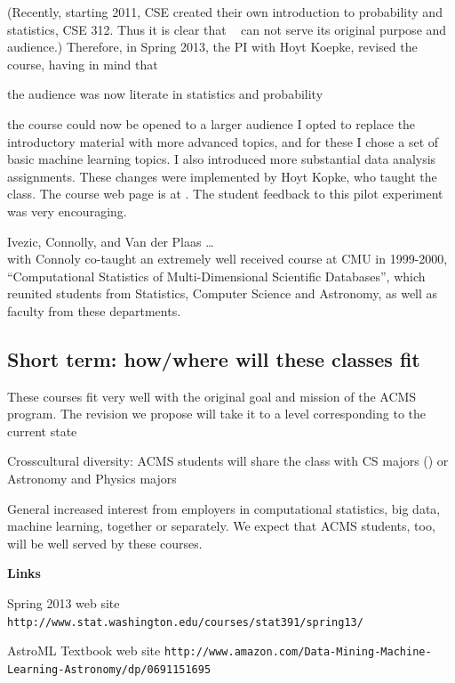 (Recently, starting 2011, CSE created their own introduction to
probability and statistics, {\sc CSE 312}. Thus it is clear that
\statcl~ can not serve its original purpose and audience.)
Therefore, in Spring 2013, the PI \meila with Hoyt Koepke, revised the
course, having in mind that \bit
\item the audience was now literate in statistics and probability
\item the course could now be opened to a larger audience 
\eit
I opted to replace the introductory material with more advanced topics, and for these I chose a set of basic machine learning topics. I also introduced more substantial data analysis assignments. These changes were implemented by Hoyt Kopke, who taught the class. The course web page is at {\tt }. The student feedback to this pilot experiment was very encouraging. 

Ivezic, Connolly, and Van der Plaas \ldots \\
\meila with Connoly co-taught an extremely well received course at CMU
in 1999-2000, ``Computational Statistics of Multi-Dimensional
Scientific Databases'', which reunited students from Statistics,
Computer Science and Astronomy, as well as faculty from these
departments.



\subsection{Short term: how/where will these classes fit}
\bit
\item These courses fit very well with the original goal and mission of the  ACMS program. The revision we propose will take it to a level corresponding to the current state
\item Crosscultural diversity: ACMS students will share the class with CS majors (\statcl) or Astronomy and Physics majors
\item General increased interest from employers in computational statistics, big data, machine learning, together or separately. We expect that ACMS students, too, will be well served by these courses.

\item[]{\bf Links}
\item \statcl Spring 2013 web site {\tt http://www.stat.washington.edu/courses/stat391/spring13/}
\item AstroML Textbook web site {\tt http://www.amazon.com/Data-Mining-Machine-Learning-Astronomy/dp/0691151695}
\eit












